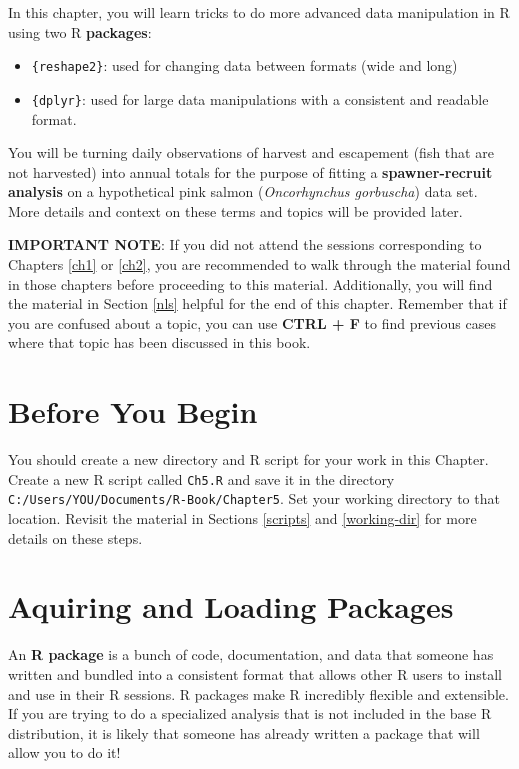 \documentclass[]{book}
\providecommand{\tightlist}{%
  \setlength{\itemsep}{0pt}\setlength{\parskip}{0pt}}
\theoremstyle{definition}
\theoremstyle{definition}
\theoremstyle{definition}
\theoremstyle{remark}
\begin{document}
In this chapter, you will learn tricks to do more advanced data
manipulation in R using two R \textbf{packages}:

\begin{itemize}
\tightlist
\item
  \texttt{\{reshape2\}}: used for changing data between formats (wide
  and long)
\item
  \texttt{\{dplyr\}}: used for large data manipulations with a
  consistent and readable format.
\end{itemize}

You will be turning daily observations of harvest and escapement (fish
that are not harvested) into annual totals for the purpose of fitting a
\textbf{spawner-recruit analysis} on a hypothetical pink salmon
(\emph{Oncorhynchus gorbuscha}) data set. More details and context on
these terms and topics will be provided later.

\textbf{IMPORTANT NOTE}: If you did not attend the sessions
corresponding to Chapters \ref{ch1} or \ref{ch2}, you are recommended to
walk through the material found in those chapters before proceeding to
this material. Additionally, you will find the material in Section
\ref{nls} helpful for the end of this chapter. Remember that if you are
confused about a topic, you can use \textbf{CTRL + F} to find previous
cases where that topic has been discussed in this book.

\section*{Before You Begin}\label{before-you-begin-3}

You should create a new directory and R script for your work in this
Chapter. Create a new R script called \texttt{Ch5.R} and save it in the
directory \texttt{C:/Users/YOU/Documents/R-Book/Chapter5}. Set your
working directory to that location. Revisit the material in Sections
\ref{scripts} and \ref{working-dir} for more details on these steps.

\section{Aquiring and Loading
Packages}\label{aquiring-and-loading-packages}

An \textbf{R package} is a bunch of code, documentation, and data that
someone has written and bundled into a consistent format that allows
other R users to install and use in their R sessions. R packages make R
incredibly flexible and extensible. If you are trying to do a
specialized analysis that is not included in the base R distribution, it
is likely that someone has already written a package that will allow you
to do it!
\end{document}
